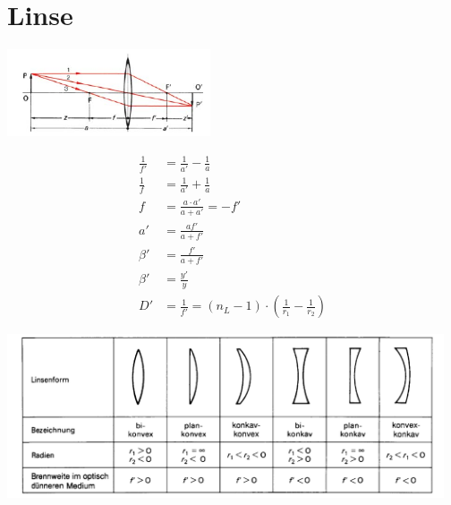 \section{Linse}
\begin{multicols}{2}
\begin{center}
 \includegraphics[width=60mm,keepaspectratio=true]{./Physik/Bilder/Linse.png}
\end{center}
\begin{align*}
\frac{1}{f'}&=\frac{1}{a'}-\frac{1}{a}\\
\frac{1}{f}&=\frac{1}{a'}+\frac{1}{a}\\
f&=\frac{a\cdot a'}{a+a'}=-f'\\
a'&=\frac{af'}{a+f'}\\
\beta'&=\frac{f'}{a+f'}\\
\beta'&=\frac{y'}{y}\\
D'&=\frac{1}{f'}=\left(n_L-1\right)\cdot\left(\frac{1}{r_1}-\frac{1}{r_2}\right)
\end{align*}
\end{multicols}

\begin{center}
 \includegraphics[width=129mm,keepaspectratio=true]{./Physik/Bilder/Beispiele-Linsen.png}
\end{center}

\newpage
